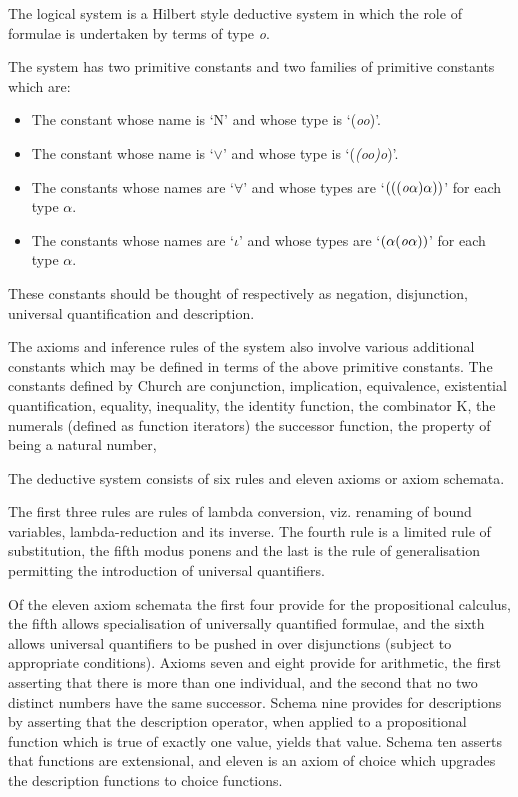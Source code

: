 \documentclass[10pt,titlepage]{book}
\begin{document}
The logical system is a Hilbert style deductive system in which the role of formulae is undertaken by terms of type {\it o}.

The system has two primitive constants and two families of primitive constants which are:
\begin{itemize}
\item The constant whose name is `N' and whose type is `({\it oo})'.
\item The constant whose name is `$\lor$' and whose type is `({\it (oo)o})'.
\item The constants whose names are `$\forall$' and whose types are `$({\it ((o\alpha)\alpha)})$' for each type $\alpha$.
\item The constants whose names are `$\iota$' and whose types are `$({\it \alpha(o\alpha)})$' for each type $\alpha$.
\end{itemize}

These constants should be thought of respectively as negation, disjunction, universal quantification and description.

The axioms and inference rules of the system also involve various additional constants which may be defined in terms of the above primitive constants.
The constants defined by Church are conjunction, implication, equivalence, existential quantification, equality, inequality, the identity function, the combinator K, the numerals (defined as function iterators) the successor function, the property of being a natural number, 

The deductive system consists of six rules and eleven axioms or axiom schemata.

The first three rules are rules of lambda conversion, viz. renaming of bound variables, lambda-reduction and its inverse.
The fourth rule is a limited rule of substitution, the fifth modus ponens and the last is the rule of generalisation permitting the introduction of universal quantifiers.

Of the eleven axiom schemata the first four provide for the propositional calculus, the fifth allows specialisation of universally quantified formulae, and the sixth allows universal quantifiers to be pushed in over disjunctions (subject to appropriate conditions).
Axioms seven and eight provide for arithmetic, the first asserting that there is more than one individual, and the second that no two distinct numbers have the same successor.
Schema nine provides for descriptions by asserting that the description operator, when applied to a propositional function which is true of exactly one value, yields that value.
Schema ten asserts that functions are extensional, and eleven is an axiom of choice which upgrades the description functions to choice functions.
\end{document}
